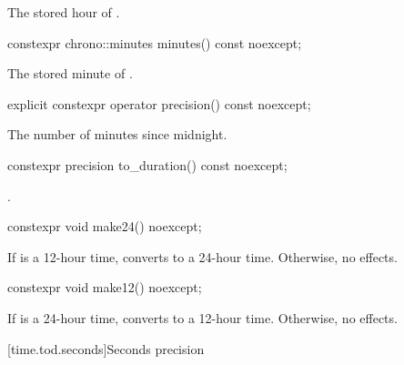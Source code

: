 \begin{itemdescr}
\pnum
\returns The stored hour of .
\end{itemdescr}

%
\begin{itemdecl}
constexpr chrono::minutes minutes() const noexcept;
\end{itemdecl}

\begin{itemdescr}
\pnum
\returns The stored minute of .
\end{itemdescr}

%
\begin{itemdecl}
explicit constexpr operator precision() const noexcept;
\end{itemdecl}

\begin{itemdescr}
\pnum
\returns The number of minutes since midnight.
\end{itemdescr}

%
\begin{itemdecl}
constexpr precision to_duration() const noexcept;
\end{itemdecl}

\begin{itemdescr}
\pnum
\returns {}.
\end{itemdescr}

%
\begin{itemdecl}
constexpr void make24() noexcept;
\end{itemdecl}

\begin{itemdescr}
\pnum
\effects
If  is a 12-hour time,
converts to a 24-hour time.
Otherwise, no effects.
\end{itemdescr}

%
\begin{itemdecl}
constexpr void make12() noexcept;
\end{itemdecl}

\begin{itemdescr}
\pnum
\effects
If  is a 24-hour time,
converts to a 12-hour time.
Otherwise, no effects.
\end{itemdescr}

[time.tod.seconds]{Seconds precision}

